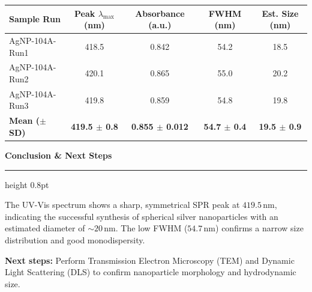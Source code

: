 \documentclass[10pt,letterpaper]{article}
\newcommand{\labsection}[1]{%
  \vspace{10pt}
  {\color{accent}\noindent\large\bfseries\sffamily #1}
  \vspace{3pt}
  {\color{bordercolor}\hrule height 0.8pt}
  \vspace{5pt}
}
\begin{document}
\begin{entryarea}
  \vspace{6pt}
  \begin{center}
    \small
    \begin{tabularx}{\linewidth}{@{}>{\raggedright\arraybackslash}X c c c c@{}}
      \toprule
      \textbf{Sample Run} & \textbf{Peak $\lambda_{\max}$ (nm)} & \textbf{Absorbance (a.u.)} & \textbf{FWHM (nm)} & \textbf{Est. Size (nm)} \\
      \midrule
      AgNP-104A-Run1 & 418.5 & 0.842 & 54.2 & 18.5 \\
      AgNP-104A-Run2 & 420.1 & 0.865 & 55.0 & 20.2 \\
      AgNP-104A-Run3 & 419.8 & 0.859 & 54.8 & 19.8 \\
      \midrule
      \textbf{Mean ($\pm$ SD)} & \textbf{419.5 $\pm$ 0.8} & \textbf{0.855 $\pm$ 0.012} & \textbf{54.7 $\pm$ 0.4} & \textbf{19.5 $\pm$ 0.9} \\
      \bottomrule
    \end{tabularx}
  \end{center}
  \vspace{2pt}

  \labsection{Conclusion \& Next Steps}
  The UV-Vis spectrum shows a sharp, symmetrical SPR peak at $419.5\,\text{nm}$, indicating the successful synthesis of spherical silver nanoparticles with an estimated diameter of $\sim 20\,\text{nm}$. The low FWHM ($54.7\,\text{nm}$) confirms a narrow size distribution and good monodispersity.
  
  \textbf{Next steps:} Perform Transmission Electron Microscopy (TEM) and Dynamic Light Scattering (DLS) to confirm nanoparticle morphology and hydrodynamic size.
\end{entryarea}
\end{document}
